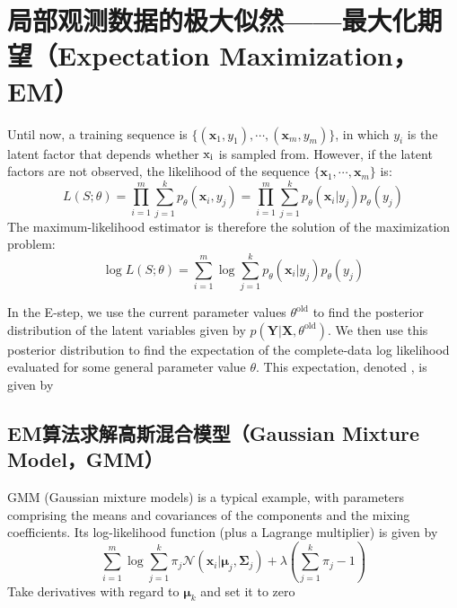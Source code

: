 \documentclass{article}
\begin{document}
\section{局部观测数据的极大似然——最大化期望（Expectation Maximization，EM）}
	Until now, a training sequence is $\{(\bm{x}_1,y_1),\cdots,(\bm{x}_m,y_m)\}$, in which $y_i$ is the latent factor that depends whether $\rm{x}_i$ is sampled from. However, if the latent factors are not observed, the likelihood of the sequence $\{\bm{x}_1,\cdots,\bm{x}_m\}$ is:
	\begin{equation*}
	L(S;\theta) = \prod_{i=1}^m \sum_{j=1}^k p_\theta(\bm{x}_i,y_j) = \prod_{i=1}^m \sum_{j=1}^k p_\theta(\bm{x}_i|y_j)p_\theta(y_j)
	\end{equation*}
	The maximum-likelihood estimator is therefore the solution of the maximization problem:
	\begin{equation}
	\log L(S;\theta) = \sum_{i=1}^m \log \sum_{j=1}^k p_\theta(\bm{x}_i|y_j)p_\theta(y_j)
	\end{equation}
	
	In the E-step, we use the current parameter values $\theta^{\mathrm{old}}$ to find the posterior distribution of the latent variables given by $p(\bm{Y}|\bm{X}, \theta^{\mathrm{old}})$. We then use this posterior distribution to find the expectation of the complete-data log likelihood evaluated for some general parameter value $\theta$. This expectation, denoted , is given by
	
	\subsection{EM算法求解高斯混合模型（Gaussian Mixture Model，GMM）}
	
	GMM (Gaussian mixture models) is a typical example, with parameters comprising the means and covariances of the components and the mixing coefficients. Its log-likelihood function (plus a Lagrange multiplier) is given by
	\begin{equation*}
	\sum_{i=1}^m \log \sum_{j=1}^k \pi_j \mathcal{N} (\bm{x}_i|\bm{\mu}_j,\bm{\Sigma}_j) + \lambda \left(\sum_{j=1}^k \pi_j - 1\right)
	\end{equation*}
	Take derivatives with regard to $\bm{\mu}_k$ and set it to zero
	
\end{document}
